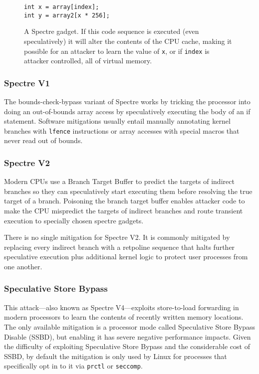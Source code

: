 \begin{figure}[h]
\begin{lstlisting}
int x = array[index];
int y = array2[x * 256];
\end{lstlisting}
\caption{A Spectre gadget. If this code sequence is executed (even speculatively) it will alter the contents of the CPU cache, making it possible for an attacker to learn the value of \texttt{x}, or if \texttt{index} is attacker controlled, all of virtual memory. }
\label{fig:spectre-gadget}
\end{figure}

\subsubsection{Spectre V1}
The bounds-check-bypass variant of Spectre works by tricking the processor into doing an out-of-bounds array access by speculatively executing the body of an if statement.
Software mitigations usually entail manually annotating kernel branches with \texttt{lfence} instructions or array accesses with special macros that never read out of bounds.

\subsubsection{Spectre V2}

Modern CPUs use a Branch Target Buffer to predict the targets of indirect branches so they can speculatively start executing them before resolving the true target of a branch.
Poisoning the branch target buffer enables attacker code to make the CPU mispredict the targets of indirect branches and route transient execution to specially chosen spectre gadgets.

There is no single mitigation for Spectre V2.
It is commonly mitigated by replacing every indirect branch with a retpoline sequence \cite{intel:retpoline} that halts further speculative execution plus additional kernel logic to protect user processes from one another.

\subsubsection{Speculative Store Bypass}
This attack---also known as Spectre V4---exploits store-to-load forwarding in modern processors to learn the contents of recently written memory locations.
The only available mitigation is a processor mode called Speculative Store Bypass Disable (SSBD), but enabling it has severe negative performance impacts.
Given the difficulty of exploiting Speculative Store Bypass and the considerable cost of SSBD, by default the mitigation is only used by Linux for processes that specifically opt in to it via \texttt{prctl} or \texttt{seccomp}.

